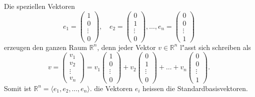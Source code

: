 \begin{beispiel}
Die speziellen Vektoren
\[
e_1=\begin{pmatrix}1\\0\\\vdots\\0\end{pmatrix},\quad
e_2=\begin{pmatrix}0\\1\\\vdots\\0\end{pmatrix},
\dots,
e_n=\begin{pmatrix}0\\0\\\vdots\\1\end{pmatrix}
\]
erzeugen den ganzen Raum $\mathbb R^n$, denn jeder Vektor $v\in\mathbb R^n$
l"asst sich schreiben als
\[
v=\begin{pmatrix}v_1\\v_2\\\vdots\\v_n\end{pmatrix}
=
v_1\begin{pmatrix}1\\0\\\vdots\\0\end{pmatrix}+
v_2\begin{pmatrix}0\\1\\\vdots\\0\end{pmatrix}+
\dots+
v_n\begin{pmatrix}0\\0\\\vdots\\1\end{pmatrix}.
\]
Somit ist $\mathbb R^n=\langle e_1,e_2,\dots,e_n\rangle$.
die Vektoren $e_i$ heissen die Standardbasisvektoren.
\end{beispiel}

